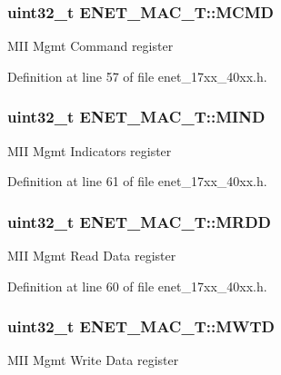 \subsubsection[{\texorpdfstring{M\+C\+MD}{MCMD}}]{ uint32\+\_\+t E\+N\+E\+T\+\_\+\+M\+A\+C\+\_\+\+T\+::\+M\+C\+MD}\hypertarget{structENET__MAC__T_af5015dd00c915a85f7aa387444349f59}{}\label{structENET__MAC__T_af5015dd00c915a85f7aa387444349f59}
M\+II Mgmt Command register 

Definition at line 57 of file enet\+\_\+17xx\+\_\+40xx.\+h.

\subsubsection[{\texorpdfstring{M\+I\+ND}{MIND}}]{ uint32\+\_\+t E\+N\+E\+T\+\_\+\+M\+A\+C\+\_\+\+T\+::\+M\+I\+ND}\hypertarget{structENET__MAC__T_a6d107736b77b59d7188fb6faa04ea549}{}\label{structENET__MAC__T_a6d107736b77b59d7188fb6faa04ea549}
M\+II Mgmt Indicators register 

Definition at line 61 of file enet\+\_\+17xx\+\_\+40xx.\+h.

\subsubsection[{\texorpdfstring{M\+R\+DD}{MRDD}}]{ uint32\+\_\+t E\+N\+E\+T\+\_\+\+M\+A\+C\+\_\+\+T\+::\+M\+R\+DD}\hypertarget{structENET__MAC__T_a98a3f303ec4276150d3d4b8586f2a71d}{}\label{structENET__MAC__T_a98a3f303ec4276150d3d4b8586f2a71d}
M\+II Mgmt Read Data register 

Definition at line 60 of file enet\+\_\+17xx\+\_\+40xx.\+h.

\subsubsection[{\texorpdfstring{M\+W\+TD}{MWTD}}]{ uint32\+\_\+t E\+N\+E\+T\+\_\+\+M\+A\+C\+\_\+\+T\+::\+M\+W\+TD}\hypertarget{structENET__MAC__T_a588ac0beb769e9cabb7039582625a3e0}{}\label{structENET__MAC__T_a588ac0beb769e9cabb7039582625a3e0}
M\+II Mgmt Write Data register 

